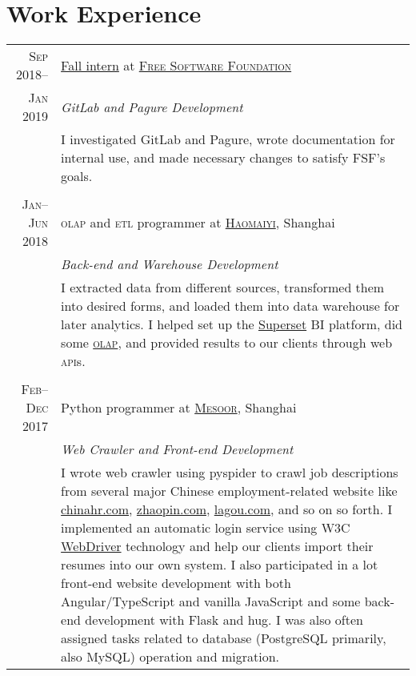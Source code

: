 \documentclass[a4paper,11pt]{article}
\begin{document}
\section{Work Experience}
\begin{tabularx}{.935\textwidth}{r|X}
  \textsc{Sep 2018--}    & \href{https://www.fsf.org/blogs/sysadmin/introducing-lei-zhao-intern-with-the-fsf-tech-team}{Fall intern} at \href{https://www.fsf.org/}{\scshape Free Software Foundation} \\
  \textsc{Jan 2019}      & \emph{GitLab and Pagure Development} \\
                         & \footnotesize I investigated GitLab and Pagure, wrote documentation for internal use, and made necessary changes to satisfy FSF's goals.\\
  \multicolumn{2}{c}{} \\
  \textsc{Jan--Jun 2018} & \textsc{olap} and \textsc{etl} programmer at \href{https://www.haomaiyi.com/}{\scshape Haomaiyi}, Shanghai \\
                         & \emph{Back-end and Warehouse Development} \\
                         & \footnotesize I extracted data from different sources, transformed them into desired forms, and loaded them into data warehouse for later analytics.  I helped set up the \href{https://superset.incubator.apache.org/}{Superset} BI platform, did some \href{https://en.wikipedia.org/wiki/Online_analytical_processing}{\scshape olap}, and provided results to our clients through web \textsc{api}s.\\
  \multicolumn{2}{c}{} \\
  \textsc{Feb--Dec 2017} & Python programmer at \href{https://www.mesoor.com/}{\scshape Mesoor}, Shanghai \\
                         & \emph{Web Crawler and Front-end Development}\\
                         & \footnotesize I wrote web crawler using pyspider to crawl job descriptions from several major Chinese employment-related website like \href{http://www.chinahr.com/}{chinahr.com}, \href{https://www.zhaopin.com/}{zhaopin.com}, \href{https://www.lagou.com/}{lagou.com}, and so on so forth.  I implemented an automatic login service using W3C \href{https://github.com/w3c/web-platform-tests/pull/6743}{WebDriver} technology and help our clients import their resumes into our own system.  I also participated in a lot front-end website development with both Angular/TypeScript and vanilla JavaScript and some back-end development with Flask and hug.  I was also often assigned tasks related to database (PostgreSQL primarily, also MySQL) operation and migration.\\

\end{tabularx}
\end{document}
